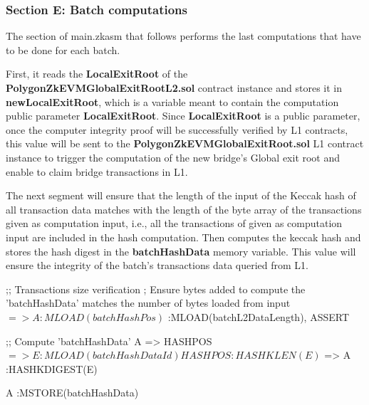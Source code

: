 \subsubsection{Section E: Batch computations}

The section of main.zkasm that follows performs the last computations that have to be done for each batch.

First, it reads the \textbf{LocalExitRoot} of the \textbf{PolygonZkEVMGlobalExitRootL2.sol} contract instance and stores it in \textbf{newLocalExitRoot}, which is a variable meant to contain the computation public parameter \textbf{LocalExitRoot}. Since  \textbf{LocalExitRoot} is a public parameter, once the computer integrity proof will be successfully verified by L1 contracts, this value will be sent to the \textbf{PolygonZkEVMGlobalExitRoot.sol} L1 contract instance to trigger the computation of the new bridge's Global exit root and enable to claim bridge transactions in L1.


The next segment will ensure that the length of the input of the Keccak hash of all transaction data matches with the length of the byte array of the transactions given as computation input, i.e., all the transactions of given as computation input are included in the hash computation. Then computes the keccak hash and stores the hash digest in the \textbf{batchHashData} memory variable. This value will ensure the integrity of the batch's transactions data queried from L1.

\begin{zkasm}
    ;; Transactions size verification
    ; Ensure bytes added to compute the 'batchHashData' matches the number of bytes loaded from input
    $ => A                          :MLOAD(batchHashPos)
    $                               :MLOAD(batchL2DataLength), ASSERT
    
    ;; Compute 'batchHashData'
    A => HASHPOS
    $ => E                          :MLOAD(batchHashDataId)
    
    HASHPOS                         :HASHKLEN(E)
    $ => A                          :HASHKDIGEST(E)
    
    A                               :MSTORE(batchHashData)
\end{zkasm}

